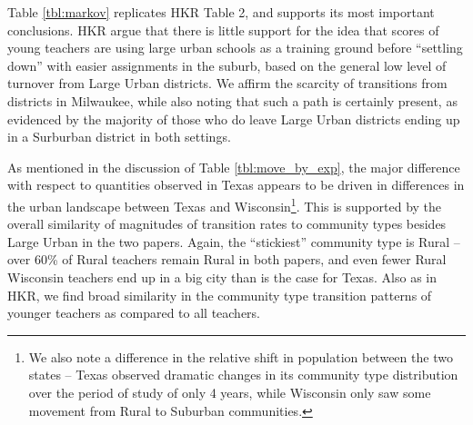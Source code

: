 \documentclass[]{article}
\let\rmarkdownfootnote\footnote%
\def\footnote{\protect\rmarkdownfootnote}
\begin{document}
Table \ref{tbl:markov} replicates HKR Table 2, and supports its most
important conclusions. HKR argue that there is little support for the
idea that scores of young teachers are using large urban schools as a
training ground before ``settling down'' with easier assignments in the
suburb, based on the general low level of turnover from Large Urban
districts. We affirm the scarcity of transitions from districts in
Milwaukee, while also noting that such a path is certainly present, as
evidenced by the majority of those who do leave Large Urban districts
ending up in a Surburban district in both settings.

As mentioned in the discussion of Table \ref{tbl:move_by_exp}, the major
difference with respect to quantities observed in Texas appears to be
driven in differences in the urban landscape between Texas and
Wisconsin\footnote{We also note a difference in the relative shift in
  population between the two states -- Texas observed dramatic changes
  in its community type distribution over the period of study of only 4
  years, while Wisconsin only saw some movement from Rural to Suburban
  communities.}. This is supported by the overall similarity of
magnitudes of transition rates to community types besides Large Urban in
the two papers. Again, the ``stickiest'' community type is Rural -- over
60\% of Rural teachers remain Rural in both papers, and even fewer Rural
Wisconsin teachers end up in a big city than is the case for Texas. Also
as in HKR, we find broad similarity in the community type transition
patterns of younger teachers as compared to all teachers.
\end{document}
